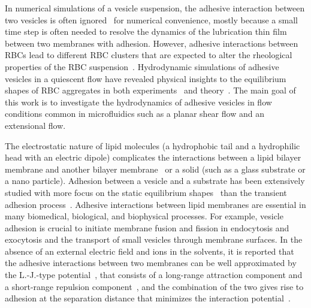 \documentclass[prf,superscriptaddress,showpacs]{revtex4-1}
\begin{document}
In numerical simulations of a vesicle suspension, the adhesive
interaction between two vesicles is often
ignored~\cite{Veerapaneni2009_JCP,  RahimianVeerapaneniBiros2010_JCP}
for numerical convenience, mostly because a small time step is often
needed to resolve the dynamics of the lubrication thin film between two
membranes with adhesion.  However, adhesive interactions between RBCs
lead to different RBC clusters that are expected to alter the
rheological properties of the RBC suspension~\cite{NeuMeiselman2002_BJ,
SvetinaZiherl2008_Bioelectrochemistry}. Hydrodynamic simulations of
adhesive vesicles in a quiescent flow have revealed physical insights to
the equilibrium shapes of RBC aggregates in both
experiments~\cite{FlormannAouane2017_SciReports} and
theory~\cite{ZiherlSvetina2007_PNAS}. The main goal of this work is to
investigate the hydrodynamics of adhesive vesicles in flow conditions
common in microfluidics such as a planar shear flow and an
extensional flow.

The electrostatic nature of lipid molecules (a hydrophobic tail and a
hydrophilic head with an electric dipole) complicates the interactions
between a lipid bilayer membrane and another bilayer
membrane~\cite{EvansMetcalfe1984_BJ, Book_PhysicalBasisCellAdhesion,
Book_IntermolecularSurfaceForces, PerutkovaFrank-Bertoncelij2013_CSB} or
a solid (such as a glass substrate or a nano particle).  Adhesion
between a vesicle and a substrate has been extensively studied with more
focus on the static equilibrium shapes~\cite{Seifert1990_PRA,
ShiFengGao2006_ActaMechSin, LinFreund2007_IntJSolidsStructures,
GruhnFrankeDimova2007_Langmuir,das2008adhesion, zhang2009phase,
SteinkuhlerAgudo-Canalejo2016_BJ} than the transient adhesion
process~\cite{cantat1999lift, suk-sei2001, BlountMiksisDavis2013_PRSa}.
Adhesive interactions between lipid membranes are essential in many
biomedical, biological, and biophysical processes.  For example, vesicle
adhesion is crucial to initiate membrane fusion and fission in
endocytosis and exocytosis and the transport of small vesicles through
membrane surfaces.  In the absence of an external electric field and
ions in the solvents, it is reported that the adhesive interactions
between two membranes can be well approximated by the L.-J.-type
potential~\cite{FlormannAouane2017_SciReports}, that consists of a
long-range attraction component and a short-range repulsion
component~\cite{Book_IntermolecularSurfaceForces}, and the combination
of the two gives rise to adhesion at the separation distance that
minimizes the interaction
potential~\cite{Book_IntermolecularSurfaceForces}. 
\end{document}
